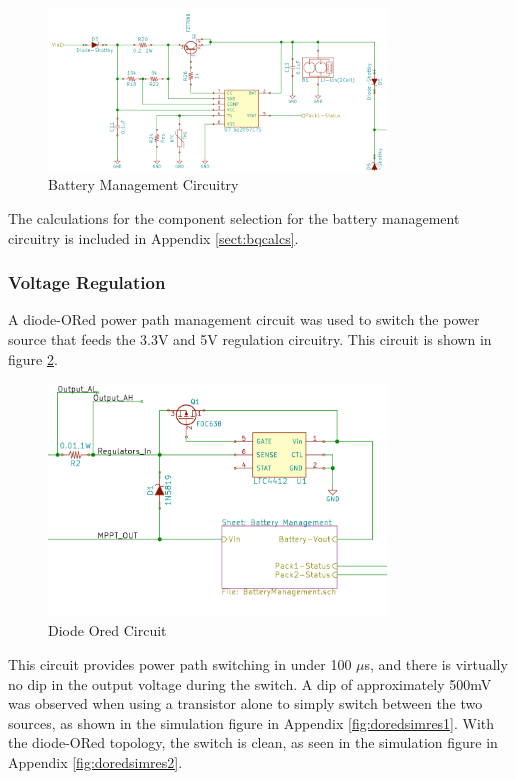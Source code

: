 \documentclass{article}
\numberwithin{figure}{section}
\numberwithin{equation}{section}
\begin{document}
{\begin{figure}[H]
	\centering
	\includegraphics[width=0.8\textwidth]{BatteryManage}
	\caption{Battery Management Circuitry}
	\label{fig:batman}
\end{figure}

The calculations for the component selection for the battery management circuitry is included in Appendix \ref{sect:bqcalcs}.

\subsubsection{Voltage Regulation}

A diode-ORed power path management circuit was used to switch the power source that feeds the 3.3V and 5V regulation circuitry. This circuit is shown in figure \ref{fig:dored}.
\begin{figure}[H]
	\centering
	\includegraphics[width=0.8\textwidth]{DiodeOR}
	\caption{Diode Ored Circuit}
	\label{fig:dored}
\end{figure}

This circuit provides power path switching in under 100 $\mu$s, and there is virtually no dip in the output voltage during the switch. A dip of approximately 500mV was observed when using a transistor alone to simply switch between the two sources, as shown in the simulation figure in Appendix \ref{fig:doredsimres1}. With the diode-ORed topology, the switch is clean, as seen in the simulation figure in Appendix \ref{fig:doredsimres2}.

}
\end{document}
